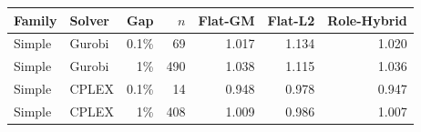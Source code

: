 \begin{tabular}{llrrrrr}
\toprule
Family & Solver & Gap & $n$ & Flat-GM & Flat-L2 & Role-Hybrid \\
\midrule
Simple & Gurobi & 0.1\% & 69 & 1.017 & 1.134 & 1.020 \\
Simple & Gurobi & 1\% & 490 & 1.038 & 1.115 & 1.036 \\
Simple & CPLEX & 0.1\% & 14 & 0.948 & 0.978 & 0.947 \\
Simple & CPLEX & 1\% & 408 & 1.009 & 0.986 & 1.007 \\
\bottomrule
\end{tabular}
